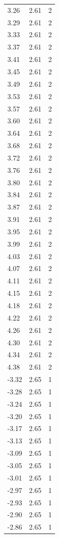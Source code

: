 \begin{longtable}{lrr}
  3.26 & 2.61 & 2 \\
  3.29 & 2.61 & 2 \\
  3.33 & 2.61 & 2 \\
  3.37 & 2.61 & 2 \\
  3.41 & 2.61 & 2 \\
  3.45 & 2.61 & 2 \\
  3.49 & 2.61 & 2 \\
  3.53 & 2.61 & 2 \\
  3.57 & 2.61 & 2 \\
  3.60 & 2.61 & 2 \\
  3.64 & 2.61 & 2 \\
  3.68 & 2.61 & 2 \\
  3.72 & 2.61 & 2 \\
  3.76 & 2.61 & 2 \\
  3.80 & 2.61 & 2 \\
  3.84 & 2.61 & 2 \\
  3.87 & 2.61 & 2 \\
  3.91 & 2.61 & 2 \\
  3.95 & 2.61 & 2 \\
  3.99 & 2.61 & 2 \\
  4.03 & 2.61 & 2 \\
  4.07 & 2.61 & 2 \\
  4.11 & 2.61 & 2 \\
  4.15 & 2.61 & 2 \\
  4.18 & 2.61 & 2 \\
  4.22 & 2.61 & 2 \\
  4.26 & 2.61 & 2 \\
  4.30 & 2.61 & 2 \\
  4.34 & 2.61 & 2 \\
  4.38 & 2.61 & 2 \\
  -3.32 & 2.65 & 1 \\
  -3.28 & 2.65 & 1 \\
  -3.24 & 2.65 & 1 \\
  -3.20 & 2.65 & 1 \\
  -3.17 & 2.65 & 1 \\
  -3.13 & 2.65 & 1 \\
  -3.09 & 2.65 & 1 \\
  -3.05 & 2.65 & 1 \\
  -3.01 & 2.65 & 1 \\
  -2.97 & 2.65 & 1 \\
  -2.93 & 2.65 & 1 \\
  -2.90 & 2.65 & 1 \\
  -2.86 & 2.65 & 1 \\

\end{longtable}
